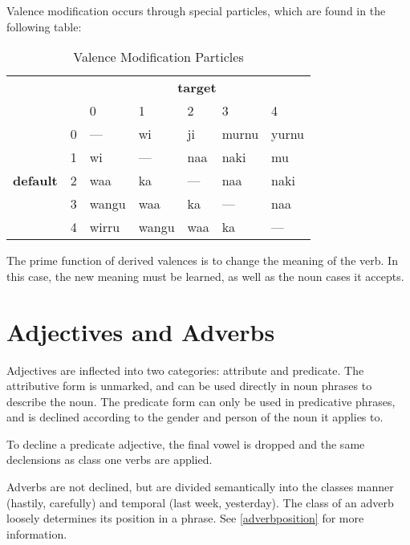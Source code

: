 Valence modification occurs through special particles, which are found in the
following table:

\begin{table}[h]
\centering
\begin{tabular}{lllllll}
                                  &   & \multicolumn{5}{c}{\textbf{target}} \\
                                  &   & 0     & 1     & 2   & 3     & 4     \\
\multirow{5}{*}{\textbf{default}} & 0 & ---   & wi    & ji  & murnu & yurnu \\
                                  & 1 & wi    & ---   & naa & naki  & mu    \\
                                  & 2 & waa   & ka    & --- & naa   & naki  \\
                                  & 3 & wangu & waa   & ka  & ---   & naa   \\
                                  & 4 & wirru & wangu & waa & ka    & ---
\end{tabular}
\caption{Valence Modification Particles}
\end{table}

The prime function of derived valences is to change the meaning of the verb. In
this case, the new meaning must be learned, as well as the noun cases it
accepts.

\section{Adjectives and Adverbs}

Adjectives are inflected into two categories: attribute and predicate. The
attributive form is unmarked, and can be used directly in noun phrases to
describe the noun. The predicate form can only be used in predicative phrases,
and is declined according to the gender and person of the noun it applies to.

To decline a predicate adjective, the final vowel is dropped and the same
declensions as class one verbs are applied.

Adverbs are not declined, but are divided semantically into the classes manner
(hastily, carefully) and temporal (last week, yesterday). The class of an adverb
loosely determines its position in a phrase. See \ref{adverbposition} for more
information.
